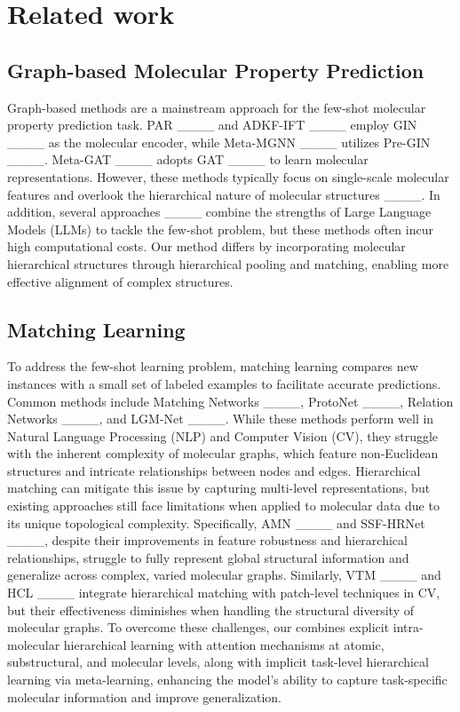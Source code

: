 \section{Related work}
\label{releted work}
% 
\subsection{Graph-based Molecular Property Prediction}
\label{subsection:releted_work_graph_based_MPP}

Graph-based methods are a mainstream approach for the few-shot molecular property prediction task. PAR ____ and ADKF-IFT ____ employ GIN ____ as the molecular encoder, while Meta-MGNN ____ utilizes Pre-GIN ____. Meta-GAT ____ adopts GAT ____ to learn molecular representations. However, these methods typically focus on single-scale molecular features and overlook the hierarchical nature of molecular structures ____.
In addition, several approaches ____ combine the strengths of Large Language Models (LLMs) to tackle the few-shot problem, but these methods often incur high computational costs.
Our method differs by incorporating molecular hierarchical structures through hierarchical pooling and matching, enabling more effective alignment of complex structures. 


\subsection{Matching Learning}
\label{matching_learning}

To address the few-shot learning problem, matching learning compares new instances with a small set of labeled examples to facilitate accurate predictions.
Common methods include Matching Networks ____, ProtoNet ____, Relation Networks ____, and LGM-Net ____.
While these methods perform well in Natural Language Processing (NLP) and Computer Vision (CV), they struggle with the inherent complexity of molecular graphs, which feature non-Euclidean structures and intricate relationships between nodes and edges. Hierarchical matching can mitigate this issue by capturing multi-level representations, but existing approaches still face limitations when applied to molecular data due to its unique topological complexity.
Specifically, 
AMN ____ and SSF-HRNet ____, despite their improvements in feature robustness and hierarchical relationships, struggle to fully represent global structural information and generalize across complex, varied molecular graphs.
Similarly, VTM ____ and HCL ____ integrate hierarchical matching with patch-level techniques in CV, but their effectiveness diminishes when handling the structural diversity of molecular graphs.
To overcome these challenges, our \method combines explicit intra-molecular hierarchical learning with attention mechanisms at atomic, substructural, and molecular levels, along with implicit task-level hierarchical learning via meta-learning, enhancing the model’s ability to capture task-specific molecular information and improve generalization.